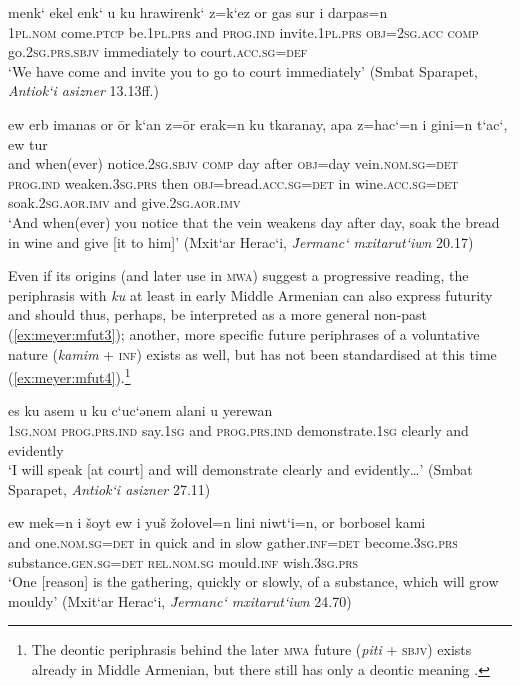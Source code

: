 \documentclass[output=paper,colorlinks,citecolor=brown]{langscibook}
\begin{document}
	\ea \label{ex:meyer:mprs1}
	\gll menk‘ ekel enk‘ u ku hrawirenk‘ z=k‘ez or gas sur i darpas=n\\
	\textsc{1pl.nom} come.\textsc{ptcp} be.\textsc{1pl.prs} and \textsc{prog.ind} invite.\textsc{1pl.prs} \textsc{obj=2sg.acc} \textsc{comp} go.\textsc{2sg.prs.sbjv} immediately to court.\textsc{acc.sg=def}\\
	\glt ‘We have come and invite you to go to court immediately’ (Smbat Sparapet, \textit{Antiok‘i asizner} 13.13ff.)
	\z {}
	
	\ea \label{ex:meyer:mprs2}
	\gll ew erb imanas or ōr k‘an z=ōr erak=n ku tkaranay, apa z=hac‘=n i gini=n t‘ac‘, ew tur\\
	and when(ever) notice.\textsc{2sg.sbjv} \textsc{comp} day after \textsc{obj}=day vein.\textsc{nom.sg=det} \textsc{prog.ind} weaken.\textsc{3sg.prs} then \textsc{obj=}bread.\textsc{acc.sg=det} in wine.\textsc{acc.sg=det} soak.\textsc{2sg.aor.imv} and give.\textsc{2sg.aor.imv}\\
	\glt ‘And when(ever) you notice that the vein weakens day after day, soak the bread in wine and give [it to him]’ (Mxit‘ar Herac‘i, \textit{J̌ermanc‘ mxitarut‘iwn} 20.17)
	\z {}

	\largerpage[1]
	
	Even if its origins (and later use in \textsc{mwa}) suggest a progressive reading, the periphrasis with \textit{ku} at least in early Middle Armenian can also express futurity and should thus, perhaps, be interpreted as a more general non-past (\ref{ex:meyer:mfut3}); another, more specific future periphrases of a voluntative nature (\textit{kamim} + \textsc{inf}) exists as well, but has not been standardised at this time (\ref{ex:meyer:mfut4}).\footnote{The deontic periphrasis behind the later \textsc{mwa} future (\textit{piti} + \textsc{sbjv}) exists already in Middle Armenian, but there still has only a deontic meaning \citep[306]{Karst1901}.}
	
	\ea \label{ex:meyer:mfut3}
	\gll es ku asem u ku c‘uc‘ənem alani u yerewan\\
	\textsc{1sg.nom} \textsc{prog.prs.ind} say.\textsc{1sg} and \textsc{prog.prs.ind} demonstrate.\textsc{1sg} clearly and evidently\\
	\glt ‘I will speak [at court] and will demonstrate clearly and evidently…’ (Smbat Sparapet, \textit{Antiok‘i asizner} 27.11)
	\z {}
	
	\ea \label{ex:meyer:mfut4}
	\gll ew mek=n i šoyt ew i yuš žołovel=n lini niwt‘i=n, or borbosel kami\\
	and one.\textsc{nom.sg=det} in quick and in slow gather.\textsc{inf=det} become.\textsc{3sg.prs} substance.\textsc{gen.sg=det} \textsc{rel.nom.sg} mould.\textsc{inf} wish.\textsc{3sg.prs}\\
	\glt ‘One [reason] is the gathering, quickly or slowly, of a substance, which will grow mouldy’ (Mxit‘ar Herac‘i, \textit{J̌ermanc‘ mxitarut‘iwn} 24.70)
	\z {}
	
\end{document}
